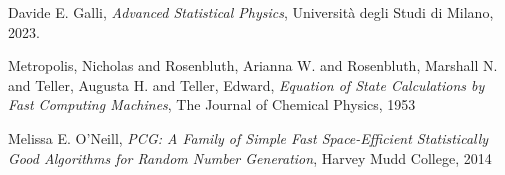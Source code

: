 \begin{thebibliography}{9}
     Davide E. Galli, \textit{Advanced Statistical Physics}, Università degli Studi di Milano, 2023.

     Metropolis, Nicholas and Rosenbluth, Arianna W. and Rosenbluth, Marshall N. and Teller, Augusta H. and Teller, Edward,
    \textit{Equation of State Calculations by Fast Computing Machines}, The Journal of Chemical Physics, 1953

     Melissa E. O'Neill, \textit{PCG: A Family of Simple Fast Space-Efficient Statistically Good Algorithms for Random Number Generation}, 
    Harvey Mudd College, 2014

\end{thebibliography}